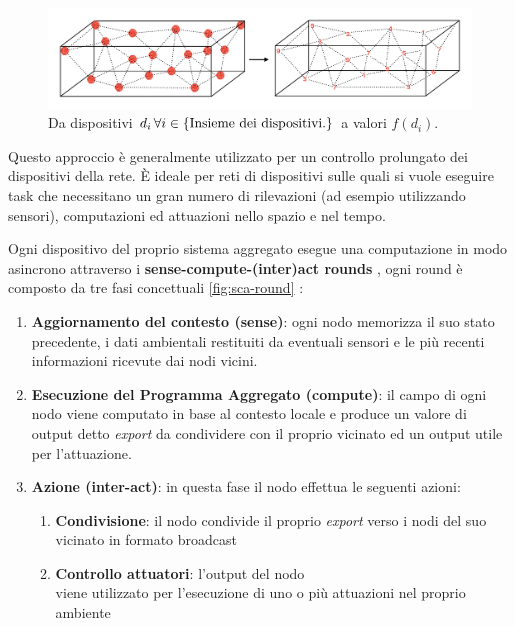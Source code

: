 \documentclass[12pt,a4paper,openright,twoside]{book}
\begin{document}
\begin{figure}
    \centering
    \includegraphics[width=.9\linewidth]{figures/device-to-value.pdf}
    \caption{Da dispositivi $d_i \thinspace \forall i \in {\text{\{Insieme dei dispositivi.\}}}$ a valori $f(d_i)$.}
    \label{fig:device-to-value}
\end{figure}

Questo approccio è generalmente utilizzato per un controllo prolungato dei dispositivi della rete. È ideale per reti di dispositivi sulle quali si vuole eseguire task che necessitano un gran numero di rilevazioni (ad esempio utilizzando sensori), computazioni ed attuazioni nello spazio e nel tempo.

Ogni dispositivo del proprio sistema aggregato esegue una computazione in modo asincrono attraverso i \textbf{sense-compute-(inter)act rounds}\label{sec:sense-compute-interact} \cite{Macroswarm}, ogni round è composto da tre fasi concettuali \cref{fig:sca-round} \cite{Casadei2021-2}:

\begin{enumerate}
    \item \textbf{Aggiornamento del contesto (sense)}: ogni nodo memorizza il suo stato precedente, i dati ambientali restituiti da eventuali sensori e le più recenti informazioni ricevute dai nodi vicini.
    \item \textbf{Esecuzione del Programma Aggregato (compute)}: il campo di ogni nodo viene computato in base al contesto locale e produce un valore di output detto \textit{export} da condividere con il proprio vicinato ed un output utile per l'attuazione.
    \item \textbf{Azione (inter-act)}: in questa fase il nodo effettua le seguenti azioni:
    \begin{enumerate}
        \item \textbf{Condivisione}: il nodo condivide il proprio \textit{export} verso i nodi del suo vicinato in formato broadcast
        \item \textbf{Controllo attuatori}: l'output del nodo \\ viene 
        utilizzato per l'esecuzione di uno o più attuazioni nel proprio ambiente
    \end{enumerate}
\end{enumerate}
\end{document}
